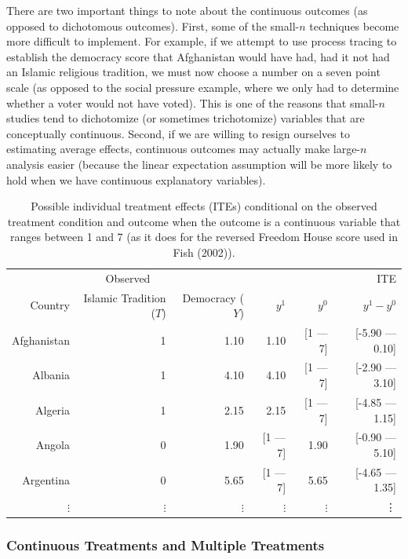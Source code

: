 \documentclass{article}
\begin{document}
There are two important things to note about the continuous outcomes (as opposed to dichotomous outcomes). First, some of the small-$n$ techniques become more difficult to implement. For example, if we attempt to use process tracing to establish the democracy score that Afghanistan would have had, had it not had an Islamic religious tradition, we must now choose a number on a seven point scale (as opposed to the social pressure example, where we only had to determine whether a voter would not have voted). This is one of the reasons that small-$n$ studies tend to dichotomize (or sometimes trichotomize) variables that are conceptually continuous. Second, if we are willing to resign ourselves to estimating average effects, continuous outcomes may actually make large-$n$ analysis easier (because the linear expectation assumption will be more likely to hold when we have continuous explanatory variables).  

\begin{table}
\begin{center}
\caption{\label{t:DiCon} Possible individual treatment effects (ITEs) conditional on the observed treatment condition and outcome when the outcome is a continuous variable that ranges between 1 and 7 (as it does for the reversed Freedom House score used in Fish (2002)).}
\begin{tabular}{rrr | rr | r}
\hline \hline
\multicolumn{3}{c|}{Observed} & & & ITE \\
Country& Islamic Tradition ($T$) & Democracy ($Y$) & $y^1$ & $y^0$ & $y^1 - y^0$  \\
\hline
Afghanistan & 1  & 1.10 & 1.10 & [1 --- 7] & [-5.90 --- 0.10] \\
Albania & 1 & 4.10 & 4.10 & [1 --- 7]  & [-2.90 --- 3.10] \\
Algeria & 1 & 2.15 & 2.15 & [1 --- 7]  & [-4.85 --- 1.15]  \\
Angola & 0  & 1.90 &  [1 --- 7]  & 1.90 & [-0.90 --- 5.10] \\
Argentina & 0 & 5.65&  [1 --- 7]  & 5.65  & [-4.65 --- 1.35] \\
$\vdots$ & $\vdots$ & $\vdots$ & $\vdots$ & $\vdots$ & \vdots  \\
\hline \hline
\end{tabular}
\end{center}
\end{table}


\subsubsection{Continuous Treatments and Multiple Treatments}
\end{document}
